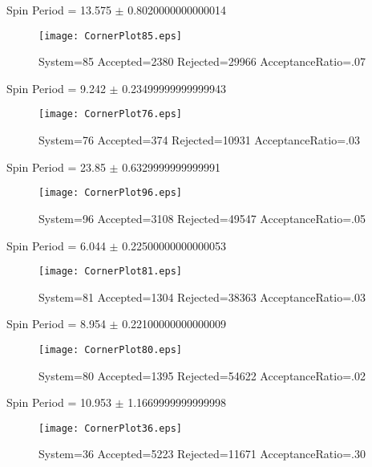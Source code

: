 \documentclass[10pt]{article}
\begin{document}
\listoffigures
\newpage
\begin{center}
        Spin Period = 13.575 $\pm$ 0.8020000000000014
        \end{center}
\begin{figure}[H] 
        \texttt{[image: CornerPlot85.eps]}
        \caption{System=85 Accepted=2380 Rejected=29966 AcceptanceRatio=.07}
        \label{S85}
        \centering
        \end{figure}
\newpage
\begin{center}
        Spin Period = 9.242 $\pm$ 0.23499999999999943
        \end{center}
\begin{figure}[H] 
        \texttt{[image: CornerPlot76.eps]}
        \caption{System=76 Accepted=374 Rejected=10931 AcceptanceRatio=.03}
        \label{S76}
        \centering
        \end{figure}
\newpage
\begin{center}
        Spin Period = 23.85 $\pm$ 0.6329999999999991
        \end{center}
\begin{figure}[H] 
        \texttt{[image: CornerPlot96.eps]}
        \caption{System=96 Accepted=3108 Rejected=49547 AcceptanceRatio=.05}
        \label{S96}
        \centering
        \end{figure}
\newpage
\begin{center}
        Spin Period = 6.044 $\pm$ 0.22500000000000053
        \end{center}
\begin{figure}[H] 
        \texttt{[image: CornerPlot81.eps]}
        \caption{System=81 Accepted=1304 Rejected=38363 AcceptanceRatio=.03}
        \label{S81}
        \centering
        \end{figure}
\newpage
\begin{center}
        Spin Period = 8.954 $\pm$ 0.22100000000000009
        \end{center}
\begin{figure}[H] 
        \texttt{[image: CornerPlot80.eps]}
        \caption{System=80 Accepted=1395 Rejected=54622 AcceptanceRatio=.02}
        \label{S80}
        \centering
        \end{figure}
\newpage
\begin{center}
        Spin Period = 10.953 $\pm$ 1.1669999999999998
        \end{center}
\begin{figure}[H] 
        \texttt{[image: CornerPlot36.eps]}
        \caption{System=36 Accepted=5223 Rejected=11671 AcceptanceRatio=.30}
        \label{S36}
        \centering
        \end{figure}
\end{document}
